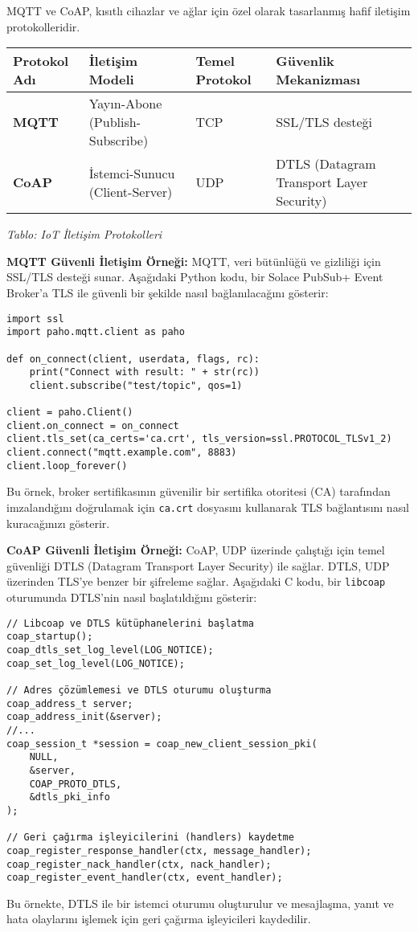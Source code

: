 MQTT ve CoAP, kısıtlı cihazlar ve ağlar için özel olarak tasarlanmış hafif iletişim protokolleridir.

\begin{tabularx}{\textwidth}{|l|X|X|X|}
\hline
\textbf{Protokol Adı} & \textbf{İletişim Modeli} & \textbf{Temel Protokol} & \textbf{Güvenlik Mekanizması} \\
\hline
\textbf{MQTT} & Yayın-Abone (Publish-Subscribe) & TCP & SSL/TLS desteği \\
\hline
\textbf{CoAP} & İstemci-Sunucu (Client-Server) & UDP & DTLS (Datagram Transport Layer Security) \\
\hline
\end{tabularx}


\textit{Tablo: IoT İletişim Protokolleri}

\textbf{MQTT Güvenli İletişim Örneği:}
MQTT, veri bütünlüğü ve gizliliği için SSL/TLS desteği sunar. Aşağıdaki Python kodu, bir Solace PubSub+ Event Broker'a TLS ile güvenli bir şekilde nasıl bağlanılacağını gösterir:
\begin{lstlisting}[breaklines=true,basicstyle=\ttfamily\footnotesize]
import ssl
import paho.mqtt.client as paho

def on_connect(client, userdata, flags, rc):
    print("Connect with result: " + str(rc))
    client.subscribe("test/topic", qos=1)

client = paho.Client()
client.on_connect = on_connect
client.tls_set(ca_certs='ca.crt', tls_version=ssl.PROTOCOL_TLSv1_2)
client.connect("mqtt.example.com", 8883)
client.loop_forever()
\end{lstlisting}
Bu örnek, broker sertifikasının güvenilir bir sertifika otoritesi (CA) tarafından imzalandığını doğrulamak için \verb|ca.crt| dosyasını kullanarak TLS bağlantısını nasıl kuracağınızı gösterir.

\textbf{CoAP Güvenli İletişim Örneği:}
CoAP, UDP üzerinde çalıştığı için temel güvenliği DTLS (Datagram Transport Layer Security) ile sağlar. DTLS, UDP üzerinden TLS'ye benzer bir şifreleme sağlar. Aşağıdaki C kodu, bir \verb|libcoap| oturumunda DTLS'nin nasıl başlatıldığını gösterir:
\begin{lstlisting}[breaklines=true,basicstyle=\ttfamily\footnotesize]
// Libcoap ve DTLS kütüphanelerini başlatma
coap_startup();
coap_dtls_set_log_level(LOG_NOTICE);
coap_set_log_level(LOG_NOTICE);

// Adres çözümlemesi ve DTLS oturumu oluşturma
coap_address_t server;
coap_address_init(&server);
//...
coap_session_t *session = coap_new_client_session_pki(
    NULL,
    &server,
    COAP_PROTO_DTLS,
    &dtls_pki_info
);

// Geri çağırma işleyicilerini (handlers) kaydetme
coap_register_response_handler(ctx, message_handler);
coap_register_nack_handler(ctx, nack_handler);
coap_register_event_handler(ctx, event_handler);
\end{lstlisting}
Bu örnekte, DTLS ile bir istemci oturumu oluşturulur ve mesajlaşma, yanıt ve hata olaylarını işlemek için geri çağırma işleyicileri kaydedilir.

